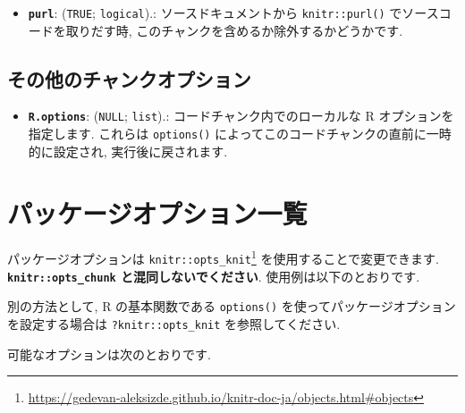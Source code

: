 \documentclass[
  11pt,
]{bxjsreport}
\newenvironment{Shaded}{\begin{snugshade}}{\end{snugshade}}
\newcommand{\AttributeTok}[1]{\textcolor[rgb]{0.77,0.63,0.00}{#1}}
\newcommand{\ConstantTok}[1]{\textcolor[rgb]{0.00,0.00,0.00}{#1}}
\newcommand{\FunctionTok}[1]{\textcolor[rgb]{0.00,0.00,0.00}{#1}}
\newcommand{\NormalTok}[1]{#1}
\newcommand{\SpecialCharTok}[1]{\textcolor[rgb]{0.00,0.00,0.00}{#1}}
\providecommand{\tightlist}{%
  \setlength{\itemsep}{0pt}\setlength{\parskip}{0pt}}
\renewcommand{\href}[2]{#2\footnote{\url{#1}}}
\begin{document}
\begin{itemize}
\tightlist
\item
  \textbf{\texttt{purl}}: (\texttt{TRUE}; \texttt{logical}).: ソースドキュメントから \texttt{knitr::purl()} でソースコードを取りだす時, このチャンクを含めるか除外するかどうかです.
\end{itemize}

\hypertarget{ux305dux306eux4ed6ux306eux30c1ux30e3ux30f3ux30afux30aaux30d7ux30b7ux30e7ux30f3}{%
\subsection{その他のチャンクオプション}\label{ux305dux306eux4ed6ux306eux30c1ux30e3ux30f3ux30afux30aaux30d7ux30b7ux30e7ux30f3}}

\begin{itemize}
\tightlist
\item
  \textbf{\texttt{R.options}}: (\texttt{NULL}; \texttt{list}).: コードチャンク内でのローカルな R オプションを指定します. これらは \texttt{options()} によってこのコードチャンクの直前に一時的に設定され, 実行後に戻されます.
\end{itemize}

\hypertarget{package-options}{%
\section{パッケージオプション一覧}\label{package-options}}

パッケージオプションは \href{https://gedevan-aleksizde.github.io/knitr-doc-ja/objects.html\#objects}{\texttt{knitr::opts\_knit}} を使用することで変更できます. \textbf{\texttt{knitr::opts\_chunk} と混同しないでください}. 使用例は以下のとおりです.

\begin{Shaded}
\end{Shaded}

別の方法として, R の基本関数である \texttt{options()} を使ってパッケージオプションを設定する場合は \texttt{?knitr::opts\_knit} を参照してください.

可能なオプションは次のとおりです.
\end{document}
